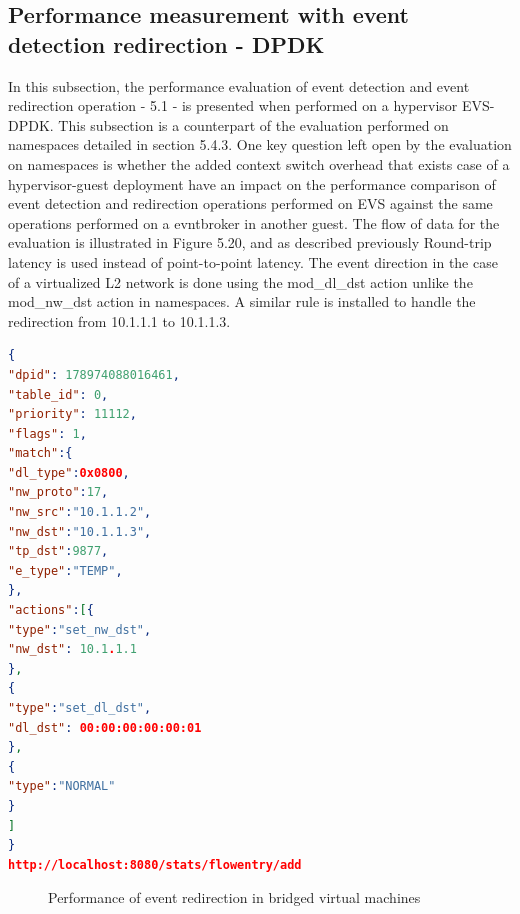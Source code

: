\subsection{Performance measurement with event detection redirection - DPDK}
In this subsection, the performance evaluation of event detection and event redirection operation - 5.1 - is presented when performed on a hypervisor EVS-DPDK. This subsection is a counterpart of the evaluation performed on namespaces detailed in section 5.4.3. One key question left open by the evaluation on namespaces is whether the added context switch overhead that exists case of a hypervisor-guest deployment have an impact on the performance comparison of event detection and redirection operations performed on EVS against the same operations performed on a evntbroker in another guest. The flow of data for the evaluation is illustrated in Figure 5.20, and as described previously Round-trip latency is used instead of point-to-point latency. The event direction in the case of a virtualized L2 network is done using the mod_dl_dst action unlike the mod_nw_dst action in namespaces. A similar rule is installed to handle the redirection from 10.1.1.1 to 10.1.1.3.

\begin{lstlisting}[language=json,firstnumber=1]
{
"dpid": 178974088016461,
"table_id": 0,
"priority": 11112,
"flags": 1,
"match":{
"dl_type":0x0800,
"nw_proto":17,
"nw_src":"10.1.1.2",
"nw_dst":"10.1.1.3",
"tp_dst":9877,
"e_type":"TEMP",
},
"actions":[{
"type":"set_nw_dst",
"nw_dst": 10.1.1.1
},
{
"type":"set_dl_dst",
"dl_dst": 00:00:00:00:00:01
},
{
"type":"NORMAL"
}
]
}
http://localhost:8080/stats/flowentry/add \end{lstlisting}



\begin{figure}[H]
 \centering
 \caption{Performance of event redirection in bridged virtual machines}
\end{figure}




